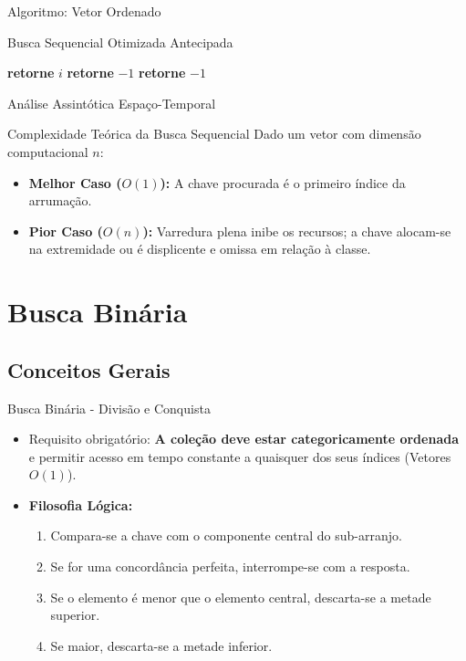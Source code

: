 \documentclass{beamer}
\begin{document}
\begin{frame}[fragile]{Algoritmo: Vetor Ordenado}
\begin{block}{Busca Sequencial Otimizada Antecipada}
\begin{algorithmic}[1]
            \State \textbf{retorne} $i$
            \State \textbf{retorne} $-1$ 
        \EndIf
    \EndFor
    \State \textbf{retorne} $-1$
\EndFunction
\end{algorithmic}
\end{block}
\end{frame}

\begin{frame}{Análise Assintótica Espaço-Temporal}
\begin{block}{Complexidade Teórica da Busca Sequencial}
Dado um vetor com dimensão computacional $n$:
\begin{itemize}
    \item \textbf{Melhor Caso ($O(1)$):} A chave procurada é o primeiro índice da arrumação.
    \item \textbf{Pior Caso ($O(n)$):} Varredura plena inibe os recursos; a chave alocam-se na extremidade ou é displicente e omissa em relação à classe.
\end{itemize}
\end{block}
\end{frame}

\section{Busca Binária}
\subsection{Conceitos Gerais}

\begin{frame}{Busca Binária - Divisão e Conquista}
\begin{itemize}
    \item Requisito obrigatório: \textbf{A coleção deve estar categoricamente ordenada} e permitir acesso em tempo constante a quaisquer dos seus índices (Vetores $O(1)$). \pause
    \item \textbf{Filosofia Lógica:}
    \begin{enumerate}
        \item Compara-se a chave com o componente central do sub-arranjo.
        \item Se for uma concordância perfeita, interrompe-se com a resposta.
        \item Se o elemento é menor que o elemento central, descarta-se a metade superior.
        \item Se maior, descarta-se a metade inferior.
    \end{enumerate}
\end{itemize}
\end{frame}
\end{document}
